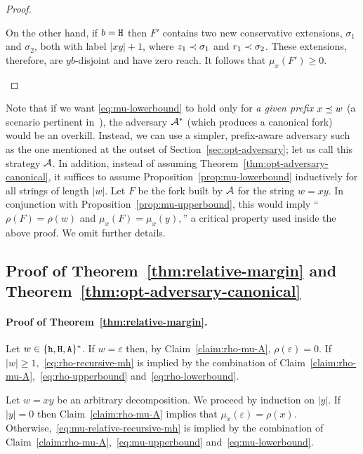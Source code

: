 \begin{proof}
\begin{description}[font=\normalfont\itshape\space]
      On the other hand, if $b = \mathtt{H}$ then 
      $F'$ contains two new conservative extensions, 
      $\sigma_1$ and $\sigma_2$, 
      both with label $|xy| + 1$, 
      where $z_1 \prec \sigma_1$ and $r_1 \prec \sigma_2$.  
      These extensions, therefore, are $yb$-disjoint 
      and have zero reach.
      It follows that $\mu_x(F') \geq 0$.
  \end{description}
\end{proof}


Note that 
if we want \eqref{eq:mu-lowerbound} 
to hold only for \emph{a given prefix} $x \preceq w$ 
(a scenario pertinent in~\cite{LinearConsistencySODA}), 
the adversary $\mathcal{A}^*$ 
(which produces a canonical fork) 
would be an overkill. 
Instead, 
we can use a simpler, prefix-aware adversary 
such as the one mentioned 
at the outset of Section~\ref{sec:opt-adversary}; 
let us call this strategy $\mathcal{A}$. 
In addition, 
instead of assuming Theorem~\ref{thm:opt-adversary-canonical}, 
it suffices to assume 
Proposition~\ref{prop:mu-lowerbound} inductively 
for all strings of length $|w|$. 
Let $F$ be the fork 
built by $\mathcal{A}$ for the string $w = xy$.
In conjunction with Proposition~\ref{prop:mu-upperbound}, 
this would imply ``$\rho(F) = \rho(w)$ and 
$\mu_x(F) = \mu_x(y),$'' 
a critical property used inside the above proof. 
We omit further details.


\subsection{Proof of Theorem~\ref{thm:relative-margin} and Theorem~\ref{thm:opt-adversary-canonical}}



\paragraph{Proof of Theorem~\ref{thm:relative-margin}.}
Let $w \in \{\mathtt{h}, \mathtt{H}, \mathtt{A}\}^*$. 
If $w = \varepsilon$ then, by Claim~\ref{claim:rho-mu-A}, 
$\rho(\varepsilon) = 0$. 
If $|w| \geq 1$,~\eqref{eq:rho-recursive-mh} is implied by 
the combination of 
Claim~\ref{claim:rho-mu-A},~\eqref{eq:rho-upperbound} and~\eqref{eq:rho-lowerbound}. 


Let $w = xy$ be an arbitrary decomposition. 
We proceed by induction on $|y|$. 
If $|y| = 0$ then 
Claim~\ref{claim:rho-mu-A} implies that $\mu_x(\varepsilon) = \rho(x)$. 
Otherwise,~\eqref{eq:mu-relative-recursive-mh} 
is implied by the combination of 
Claim~\ref{claim:rho-mu-A},~\eqref{eq:mu-upperbound} and~\eqref{eq:mu-lowerbound}.

